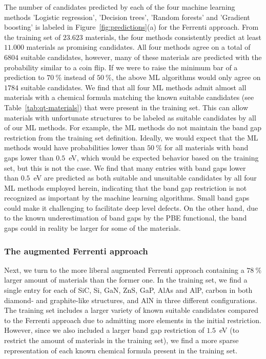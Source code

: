 \documentclass[superscriptaddress,unsortedaddress,
 amsmath,amssymb,
 aps,
]{revtex4-2}
\begin{document}


The number of candidates predicted by each of the four machine learning methods 'Logistic regression', 'Decision trees', 'Random forests' and 'Gradient boosting' is labeled in Figure~\ref{fig:predictions}(a) for the Ferrenti approach. 
From the training set of $23.623$ materials, the four methods consistently predict at least $11.000$ materials as promising candidates. All four methods agree on a total of $6804$ suitable candidates, however, many of these materials are predicted with the probability similar to a coin flip. 
If we were to raise the minimum bar of a prediction to $70 \ \%$ instead of $50 \ \%$, the above ML algorithms would only agree on $1784$ suitable candidates. 
We find that all four ML methods admit almost all materials with a chemical formula matching the known suitable candidates (see Table~\ref{tab:qt-materials}) that were present in the training set. 
This can allow materials with unfortunate structures to be labeled as suitable candidates by all of our ML methods. 
For example, the ML methods do not maintain the band gap restriction from the training set definition. 
Ideally, we would expect that the ML methods would have probabilities lower than $50 \ \%$ for all materials with band gaps lower than $0.5$~eV, which would be expected behavior based on the training set, but this is not the case. 
We find that many entries with band gaps lower than $0.5$~eV are predicted as both suitable and unsuitable candidates by all four ML methods employed herein, 
indicating that the band gap restriction is not recognized as important by the machine learning algorithms. 
Small band gaps could make it challenging to facilitate deep level defects. 
On the other hand, due to the known underestimation of band gaps by the PBE functional, the band gaps could in reality be larger for some of the materials. 

\subsubsection*{The augmented Ferrenti approach}
Next, we turn to the more liberal augmented Ferrenti approach containing a $78 \ \%$ larger amount of materials than the former one. In the training set, we find a single entry for each of SiC, Si, GaN, ZnS, GaP, AlAs and AlP, carbon in both diamond- and graphite-like structures, and AlN in three different configurations. The training set includes a larger variety of 
known 
suitable candidates compared to the Ferrenti approach due to admitting more elements in the initial restriction. However, since we also included a larger band gap restriction of $1.5$~eV (to restrict the amount of materials in the training set), we find a more sparse representation of each known 
chemical formula present in the training set. 
\end{document}
